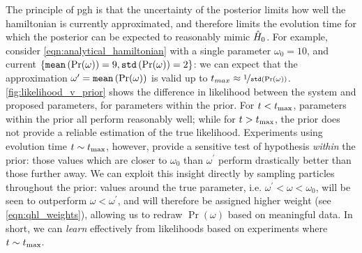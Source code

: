 The principle of \gls{pgh} is that the uncertainty of the posterior limits how well the \gls{hamiltonian} is currently 
    approximated\footnotemark, and therefore limits the evolution time for which the posterior can be expected to 
    reasonably mimic $\hat{H}_0$.
For example, consider \cref{eqn:analytical_hamiltonian} with a single parameter $\omega_0 = 10$,
    and current $\{\texttt{mean}\left(\Pr(\omega)\right) = 9, \texttt{std}\left(\Pr(\omega)\right) = 2\}$:
    we can expect that the approximation $\omega^{\prime} = \texttt{mean}\left(\Pr(\omega)\right)$ 
    is valid up to $t_{max} \approx \nicefrac{1}{\texttt{std}\left(\Pr(\omega)\right)}$.
\cref{fig:likelihood_v_prior} shows the difference in \gls{likelihood} between the system and 
    proposed parameters, for parameters within the prior.
For $t < t_{\rm{max}}$, parameters within the prior all perform reasonably well; 
    while for $t > t_{\rm{max}}$, the prior does not provide a reliable estimation of the true likelihood.
Experiments using evolution time $t \sim t_{\rm{max}}$, however, provide a sensitive test of hypothesis 
    \emph{within} the prior: 
    those values which are closer to $\omega_0$ than $\omega^{\prime}$ perform drastically better than 
    those further away. 
We can exploit this insight directly by sampling particles throughout the prior:
    values around the true parameter, i.e. $\omega^{\prime} < \omega < \omega_0$,
    will be seen to outperform $\omega < \omega^{\prime}$, 
    and will therefore be assigned higher weight (see \cref{eqn:qhl_weights}),
    allowing us to redraw $\Pr(\omega)$ based on meaningful data.
In short, we can \emph{learn} effectively from likelihoods based on experiments where $t \sim t_{\rm{max}}$. 

